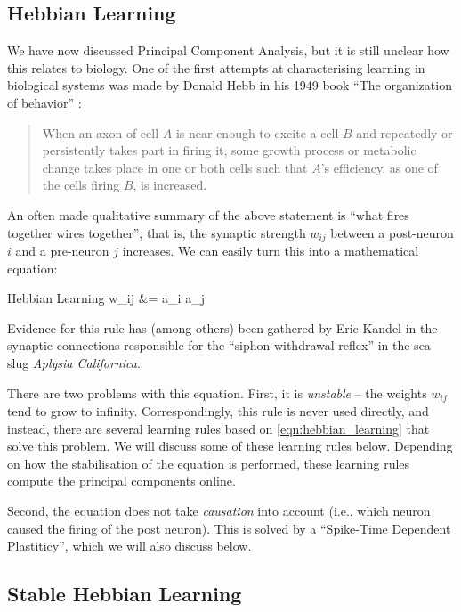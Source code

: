 \documentclass[10pt,letterpaper,oneside]{article}
\begin{document}
\subsection{Hebbian Learning}

We have now discussed Principal Component Analysis, but it is still unclear how this relates to biology.
One of the first attempts at characterising learning in biological systems was made by Donald Hebb in his 1949 book \enquote{The organization of behavior} \cite{hebb1949organization}:
\begin{quotation}
	When an axon of cell $A$ is near enough to excite a cell $B$ and repeatedly or persistently takes part in firing it, some growth process or metabolic change takes place in one or both cells such that $A$'s efficiency, as one of the cells firing $B$, is increased.
\end{quotation}
An often made qualitative summary of the above statement is \enquote{what fires together wires together}, that is, the synaptic strength $w_{ij}$ between a post-neuron $i$ and a pre-neuron $j$ increases. We can easily turn this into a mathematical equation:
\begin{ImportantEqn}{Hebbian Learning}
	\Delta w_{ij} &= \eta a_i a_j
	\label{eqn:hebbian_learning}
\end{ImportantEqn}
Evidence for this rule has (among others) been gathered by Eric Kandel in the synaptic connections responsible for the \enquote{siphon withdrawal reflex} in the sea slug \emph{Aplysia Californica}.

There are two problems with this equation. First, it is \emph{unstable} -- the weights $w_{ij}$ tend to grow to infinity. Correspondingly, this rule is never used directly, and instead, there are several learning rules based on \cref{eqn:hebbian_learning} that solve this problem. We will discuss some of these learning rules below. Depending on how the stabilisation of the equation is performed, these learning rules compute the principal components online.

Second, the equation does not take \emph{causation} into account (i.e., which neuron caused the firing of the post neuron). This is solved by a \enquote{Spike-Time Dependent Plastiticy}, which we will also discuss below.

\subsection{Stable Hebbian Learning}
\end{document}
